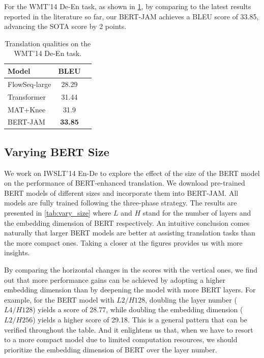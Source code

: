 \documentclass[review]{elsarticle}
\begin{document}
For the WMT'14 De-En task, as shown in \cref{tab:wmt_de2en}, by comparing to the latest results reported in the literature so far, our BERT-JAM achieves a BLEU score of 33.85, advancing the SOTA score by 2 points.

\begin{table}[ht]
    \caption{Translation qualities on the WMT'14 De-En task.}
    \label{tab:wmt_de2en}
    \centering
    \begin{tabular}{lcc}
        \toprule
        \textbf{Model}            & \textbf{BLEU}    \\
        \midrule
        FlowSeq-large \cite{Ma19} & 28.29  \\
        Transformer \cite{Vaswani17} & 31.44 \\
        MAT+Knee \cite{Iyer20} & 31.9   \\
        BERT-JAM   &   \textbf{33.85}  \\
        \bottomrule
    \end{tabular}
\end{table}


\subsection{Varying BERT Size}
\label{ssec:vary_size}
We work on IWSLT'14 En-De to explore the effect of the size of the BERT model on the performance of BERT-enhanced translation. We download pre-trained BERT models of different sizes and incorporate them into BERT-JAM. All models are fully trained following the three-phase strategy. The results are presented in \cref{tab:vary_size} where $L$ and $H$ stand for the number of layers and the embedding dimension of BERT respectively. An intuitive conclusion comes naturally that larger BERT models are better at assisting translation tasks than the more compact ones. Taking a closer at the figures provides us with more insights. 

By comparing the horizontal changes in the scores with the vertical ones, we find out that more performance gains can be achieved by adopting a higher embedding dimension than by deepening the model with more BERT layers. For example, for the BERT model with $L2/H128$, doubling the layer number ($L4/H128$) yields a score of 28.77, while doubling the embedding dimension ($L2/H256$) yields a higher score of 29.18. This is a general pattern that can be verified throughout the table. And it enlightens us that, when we have to resort to a more compact model due to limited computation resources, we should prioritize the embedding dimension of BERT over the layer number.
\end{document}
